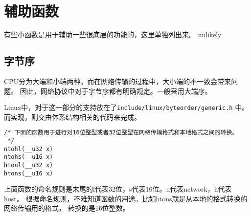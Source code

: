 \section{辅助函数}
有些小函数是用于辅助一些很底层的功能的，这里单独列出来。
                unlikely
\subsection{字节序}
CPU分为大端和小端两种。而在网络传输的过程中，大小端的不一致会带来问题。
因此，网络协议中对于字节序都有明确规定。一般采用大端序。

Linux中，对于这一部分的支持放在了\texttt{include/linux/byteorder/generic.h}
中。而实现，则交由体系结构相关的代码来完成。

\begin{verbatim}
/* 下面的函数用于进行对16位整型或者32位整型在网络传输格式和本地格式之间的转换。
 */
ntohl(__u32 x)
ntohs(__u16 x)
htonl(__u32 x)
htons(__u16 x)
\end{verbatim}

上面函数的命名规则是末尾的l代表32位，s代表16位。n代表network，h代表host。
根据命名规则，不难知道函数的用途。比如htons就是从本地的格式转换的网络传输用的格式，
转换的是16位整数。
